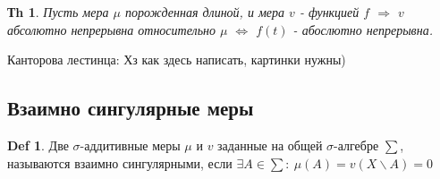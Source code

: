 \documentclass[14pt]{article}
\theoremstyle{plain}
\newtheorem{Thm}{Тh}
\theoremstyle{definition}
\newtheorem{Def}{Def}
\begin{document}
		\begin{Thm}
			Пусть мера $\mu$ порожденная длиной, и мера $v$ - функцией $f$ $\Rightarrow$ $v$ абсолютно непрерывна относительно $\mu$ $\Leftrightarrow$ $f(t)$ - абослютно непрерывна.
		\end{Thm}
		Канторова лестинца: \newline
		Хз как здесь написать, картинки нужны)
	\subsection{Взаимно сингулярные меры}
		\begin{Def}
			Две $\sigma$-аддитивные меры $\mu$ и $v$ заданные на общей $\sigma$-алгебре $\sum$, называются взаимно сингулярными, если $\exists A \in \sum: \ \mu(A) = v(X \backslash A) = 0$
		\end{Def}
\end{document}
